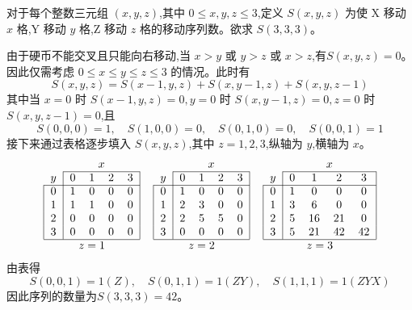 \begin{questions}
\begin{solution}
        对于每个整数三元组 $(x,y,z)$,其中 $0 \le x,y,z \le 3$,定义 $S(x,y,z)$ 为使 X 移动 $x$ 格,Y 移动 $y$ 格,Z 移动 $z$ 格的移动序列数。欲求 $S(3,3,3)$。  

        由于硬币不能交叉且只能向右移动,当 $x > y$ 或 $y > z$ 或 $x > z$,有$S(x, y, z) = 0$。因此仅需考虑 $0 \le x \le y \le z \le 3$ 的情况。此时有
        \[
        S(x,y,z) = S(x-1,y,z) + S(x,y-1,z) + S(x,y,z-1)
        \]
        其中当 $x=0$ 时 $S(x-1,y,z)=0,y=0$ 时 $S(x,y-1,z)=0,z=0$ 时 $S(x,y,z-1)=0$,且  
        \[
        S(0,0,0) = 1, \quad S(1,0,0) = 0, \quad S(0,1,0) = 0, \quad S(0,0,1) = 1
        \]
        接下来通过表格逐步填入 $S(x, y, z)$,其中 $z = 1,2,3$,纵轴为 $y$,横轴为 $x$。
        \[  
        \begin{tabular}{c c c}
            \begin{tabular}{|c|cccc|}
            \multicolumn{1}{c}{} & \multicolumn{4}{c}{$x$} \\
            \cline{2-5}
            \multicolumn{1}{c|}{$y$} & 0 & 1 & 2 & 3 \\
            \cline{1-5}
            0 & 1 & 0 & 0 & 0 \\
            1 & 1 & 1 & 0 & 0 \\
            2 & 0 & 0 & 0 & 0 \\
            3 & 0 & 0 & 0 & 0 \\
            \cline{1-5}
            \end{tabular} &
            \begin{tabular}{|c|cccc|}
            \multicolumn{1}{c}{} & \multicolumn{4}{c}{$x$} \\
            \cline{2-5}
            \multicolumn{1}{c|}{$y$} & 0 & 1 & 2 & 3 \\
            \cline{1-5}
            0 & 1 & 0 & 0 & 0 \\
            1 & 2 & 3 & 0 & 0 \\
            2 & 2 & 5 & 5 & 0 \\
            3 & 0 & 0 & 0 & 0 \\
            \cline{1-5}
            \end{tabular} &
            \begin{tabular}{|c|cccc|}
            \multicolumn{1}{c}{} & \multicolumn{4}{c}{$x$} \\
            \cline{2-5}
            \multicolumn{1}{c|}{$y$} & 0 & 1 & 2 & 3 \\
            \cline{1-5}
            0 & 1 & 0 & 0 & 0 \\
            1 & 3 & 6 & 0 & 0 \\
            2 & 5 & 16 & 21 & 0 \\
            3 & 5 & 21 & 42 & 42 \\
            \cline{1-5}
            \end{tabular} \\
            $z=1$ & $z=2$ & $z=3$
        \end{tabular}
        \]
        由表得 
        \[
        S(0,0,1)=1(Z),\quad S(0,1,1)=1(ZY),\quad S(1,1,1)=1
        (ZYX)
        \]
        因此序列的数量为$S(3,3,3)=42$。
    \end{solution}


\end{questions}
